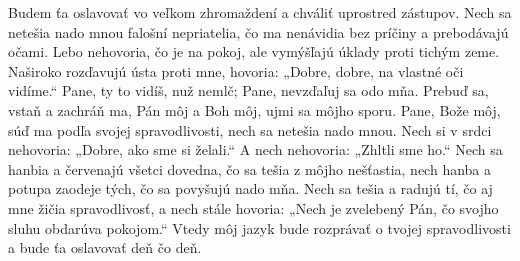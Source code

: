 Budem ťa oslavovať vo veľkom zhromaždení
a chváliť uprostred zástupov.
\versseparator
Nech sa netešia nado mnou falošní nepriatelia,
čo ma nenávidia bez príčiny a prebodávajú očami.
\versseparator
Lebo nehovoria, čo je na pokoj,
ale vymýšľajú úklady proti tichým zeme.
\versseparator
Naširoko rozďavujú ústa proti mne,
hovoria: „Dobre, dobre, na vlastné oči vidíme.“
\versseparator
Pane, ty to vidíš, nuž nemlč;
Pane, nevzďaľuj sa odo mňa.
\versseparator
Prebuď sa, vstaň a zachráň ma,
Pán môj a Boh môj, ujmi sa môjho sporu.
\versseparator
Pane, Bože môj, súď ma podľa svojej spravodlivosti,
nech sa netešia nado mnou.
\versseparator
Nech si v srdci nehovoria:
„Dobre, ako sme si želali.“
A nech nehovoria: „Zhltli sme ho.“
\versseparator
Nech sa hanbia a červenajú všetci dovedna,
čo sa tešia z môjho nešťastia,
\versseparator
nech hanba a potupa zaodeje tých,
čo sa povyšujú nado mňa.
\versseparator
Nech sa tešia a radujú tí, čo aj mne žičia spravodlivosť,
a nech stále hovoria: „Nech je zvelebený Pán,
čo svojho sluhu obdarúva pokojom.“
\versseparator
Vtedy môj jazyk bude rozprávať o tvojej spravodlivosti
a bude ťa oslavovať deň čo deň.
